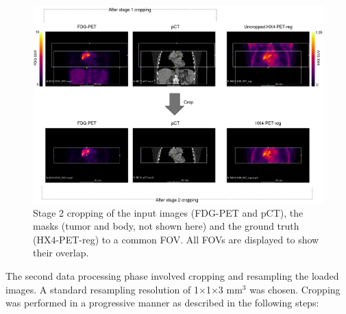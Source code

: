 \begin{figure}[h!]
    \centering
    \includegraphics[width=\linewidth]{figures/Data/fdgpet_pct_fx4petreg_crop2/N010-fdgpet_pct_hx4petreg-uncropped_crop2.png}
    \caption{Stage 2 cropping of the input images (FDG-PET and pCT), the masks (tumor and body, not shown here) and the ground truth (HX4-PET-reg) to a common FOV. All FOVs are displayed to show their overlap.}
    \label{fig:fdgpet_pct_hx4petreg_crop2}
\end{figure}

The second data processing phase involved cropping and resampling the loaded images. A standard resampling resolution of 1$\times$1$\times$3 mm$^3$ was chosen. Cropping was performed in a progressive manner as described in the following steps: 

